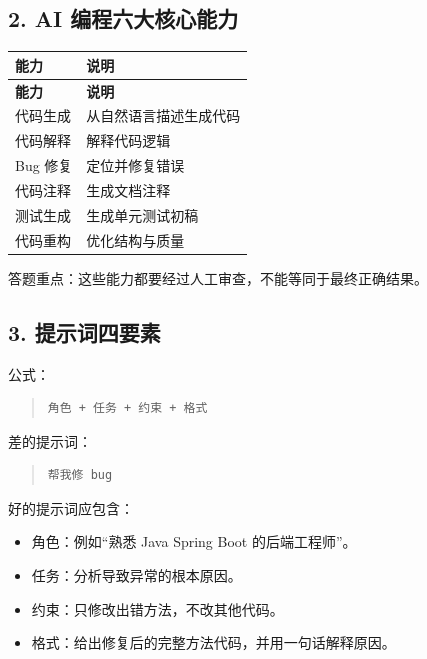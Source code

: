 \documentclass[UTF8,zihao=-4]{ctexart}
\begin{document}
\subsection{2. AI 编程六大核心能力}

{
\footnotesize
\begin{longtable}{|>{\raggedright\arraybackslash}p{}|>{\raggedright\arraybackslash}p{}|}
\hline
\textbf{能力} & \textbf{说明} \\
\hline
\endfirsthead
\hline
\textbf{能力} & \textbf{说明} \\
\hline
\endhead
代码生成 & 从自然语言描述生成代码 \\
\hline
代码解释 & 解释代码逻辑 \\
\hline
Bug 修复 & 定位并修复错误 \\
\hline
代码注释 & 生成文档注释 \\
\hline
测试生成 & 生成单元测试初稿 \\
\hline
代码重构 & 优化结构与质量 \\
\hline
\end{longtable}
}


答题重点：这些能力都要经过人工审查，不能等同于最终正确结果。

\subsection{3. 提示词四要素}

公式：

\begin{quote}
\footnotesize
\begin{verbatim}
角色 + 任务 + 约束 + 格式
\end{verbatim}
\end{quote}

差的提示词：

\begin{quote}
\footnotesize
\begin{verbatim}
帮我修 bug
\end{verbatim}
\end{quote}

好的提示词应包含：

\begin{itemize}
\item 角色：例如“熟悉 Java Spring Boot 的后端工程师”。
\item 任务：分析导致异常的根本原因。
\item 约束：只修改出错方法，不改其他代码。
\item 格式：给出修复后的完整方法代码，并用一句话解释原因。
\end{itemize}
\end{document}
